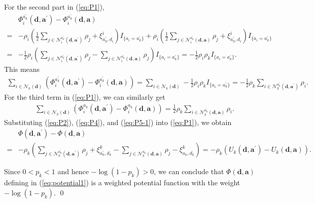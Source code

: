 For the second part in (\ref{eq:P1}), \begin{align*}
 & \Phi_{i}^{a_{k}^{'}}(\boldsymbol{d},\boldsymbol{a}^{'})-\Phi_{i}^{a_{k}^{'}}(\boldsymbol{d},\boldsymbol{a})\\
= & -\rho_{i}\left(\frac{1}{2}\sum_{j\in\mathcal{N}_{i}^{a_{k}^{'}}(\boldsymbol{d},\boldsymbol{a}^{'})}\rho_{j}+\xi_{a_{k}^{'},d_{i}}^{i}\right)I_{\{a_{i}=a_{k}^{'}\}}+\rho_{i}\left(\frac{1}{2}\sum_{j\in\mathcal{N}_{i}^{a_{k}^{'}}(\boldsymbol{d},\boldsymbol{a})}\rho_{j}+\xi_{a_{k}^{'},d_{i}}^{i}\right)I_{\{a_{i}=a_{k}^{'}\}}\\
= & -\frac{1}{2}\rho_{i}\left(\sum_{j\in\mathcal{N}_{i}^{a_{k}^{'}}(\boldsymbol{d},\boldsymbol{a}^{'})}\rho_{j}-\sum_{j\in\mathcal{N}_{i}^{a_{k}^{'}}(\boldsymbol{d},\boldsymbol{a})}\rho_{j}\right)I_{\{a_{i}=a_{k}^{'}\}}= -\frac{1}{2}\rho_{i}\rho_{k}I_{\{a_{i}=a_{k}^{'}\}}.\end{align*}
This means \begin{align}
 \sum_{i\in\mathcal{N}_{k}(\boldsymbol{d})}\left(\Phi_{i}^{a_{k}^{'}}(\boldsymbol{d},\boldsymbol{a}^{'})-\Phi_{i}^{a_{k}^{'}}(\boldsymbol{d},\boldsymbol{a})\right)=\sum_{i\in\mathcal{N}_{k}(\boldsymbol{d})}-\frac{1}{2}\rho_{i}\rho_{k}I_{\{a_{i}=a_{k}^{'}\}}=-\frac{1}{2}\rho_{k}\sum_{i\in\mathcal{N}_{k}^{a_{k}^{'}}(\boldsymbol{d},\boldsymbol{a}^{'})}\rho_{i}.\label{eq:P4}\end{align}
For the third term in (\ref{eq:P1}), we can similarly get\begin{align}
 & \sum_{i\in\mathcal{N}_{k}(\boldsymbol{d})}\left(\Phi_{i}^{a_{k}}(\boldsymbol{d},\boldsymbol{a}^{'})-\Phi_{i}^{a_{k}}(\boldsymbol{d},\boldsymbol{a})\right)=\frac{1}{2}\rho_{k}\sum_{i\in\mathcal{N}_{k}^{a_{k}^{'}}(\boldsymbol{d},\boldsymbol{a})}\rho_{i}.\label{eq:P5-1}\end{align}
Substituting (\ref{eq:P2}), (\ref{eq:P4}), and (\ref{eq:P5-1}) into
(\ref{eq:P1}), we obtain\begin{align}
 & \Phi(\boldsymbol{d},\boldsymbol{a}^{'})-\Phi(\boldsymbol{d},\boldsymbol{a})\nonumber \\
= & -\rho_{k}\left(\sum_{j\in\mathcal{N}_{k}^{a_{k}^{'}}(\boldsymbol{d},\boldsymbol{a}^{'})}\rho_{j}+\xi_{a_{k}^{'},d_{k}}^{k}-\sum_{j\in\mathcal{N}_{k}^{a_{k}}(\boldsymbol{d},\boldsymbol{a})}\rho_{j}-\xi_{a_{k},d_{k}}^{k}\right)= -\rho_{k}\left(U_{k}(\boldsymbol{d},\boldsymbol{a}^{'})-U_{k}(\boldsymbol{d},\boldsymbol{a})\right).\label{eq:P6}\end{align}

Since $0<p_{k}<1$ and hence $-\log(1-p_{k})>0$, we can conclude
that $\Phi(\boldsymbol{d},\boldsymbol{a})$ defining in (\ref{eq:potential1}) is a weighted
potential function with the weight $-\log(1-p_{k})$.
\qed

